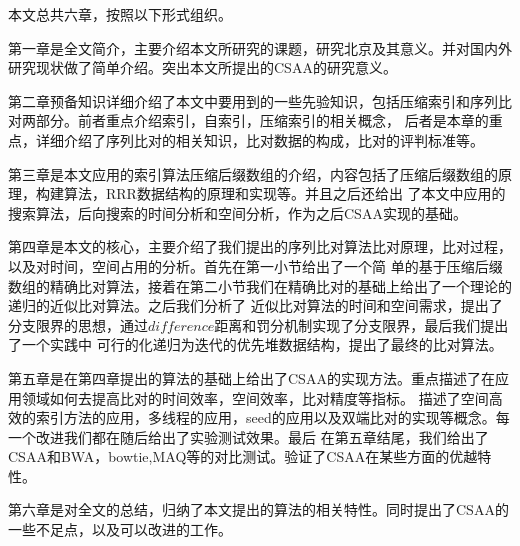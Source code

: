 本文总共六章，按照以下形式组织。

第一章是全文简介，主要介绍本文所研究的课题，研究北京及其意义。并对国内外研究现状做了简单介绍。突出本文所提出的CSAA的研究意义。

第二章预备知识详细介绍了本文中要用到的一些先验知识，包括压缩索引和序列比对两部分。前者重点介绍索引，自索引，压缩索引的相关概念，
后者是本章的重点，详细介绍了序列比对的相关知识，比对数据的构成，比对的评判标准等。

第三章是本文应用的索引算法压缩后缀数组的介绍，内容包括了压缩后缀数组的原理，构建算法，RRR数据结构的原理和实现等。并且之后还给出
了本文中应用的搜索算法，后向搜索的时间分析和空间分析，作为之后CSAA实现的基础。

第四章是本文的核心，主要介绍了我们提出的序列比对算法比对原理，比对过程，以及对时间，空间占用的分析。首先在第一小节给出了一个简
单的基于压缩后缀数组的精确比对算法，接着在第二小节我们在精确比对的基础上给出了一个理论的递归的近似比对算法。之后我们分析了
近似比对算法的时间和空间需求，提出了分支限界的思想，通过$difference$距离和罚分机制实现了分支限界，最后我们提出了一个实践中
可行的化递归为迭代的优先堆数据结构，提出了最终的比对算法。

第五章是在第四章提出的算法的基础上给出了CSAA的实现方法。重点描述了在应用领域如何去提高比对的时间效率，空间效率，比对精度等指标。
描述了空间高效的索引方法的应用，多线程的应用，seed的应用以及双端比对的实现等概念。每一个改进我们都在随后给出了实验测试效果。最后
在第五章结尾，我们给出了CSAA和BWA，bowtie,MAQ等的对比测试。验证了CSAA在某些方面的优越特性。

第六章是对全文的总结，归纳了本文提出的算法的相关特性。同时提出了CSAA的一些不足点，以及可以改进的工作。
